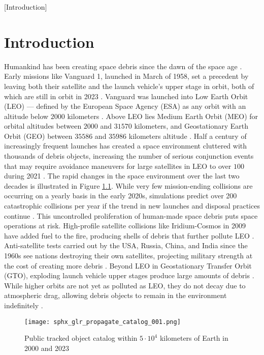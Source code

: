 [Introduction]
\graphicspath{{/Users/liamrobinson/Documents/PyLightCurves/docs/build/html/_images}}

\chapter{Introduction}

Humankind has been creating space debris since the dawn of the space age \cite{esareport2022}. Early missions like Vanguard 1, launched in March of 1958, set a precedent by leaving both their satellite and the launch vehicle's upper stage in orbit, both of which are still in orbit in 2023 \cite{vanguard1}. Vanguard was launched into Low Earth Orbit (LEO) --- defined by the European Space Agency (ESA) as any orbit with an altitude below $2000$ kilometers \cite{esareport2022}. Above LEO lies Medium Earth Orbit (MEO) for orbital altitudes between $2000$ and $31570$ kilometers, and Geostationary Earth Orbit (GEO) between $35586$ and $35986$ kilometers altitude \cite{esareport2022}. Half a century of increasingly frequent launches has created a space environment cluttered with thousands of debris objects, increasing the number of serious conjunction events that may require avoidance maneuvers for large satellites in LEO to over $100$ during 2021 \cite{esareport2022}. The rapid changes in the space environment over the last two decades is illustrated in Figure \ref{fig:catalog_comparison}. While very few mission-ending collisions are occurring on a yearly basis in the early 2020s, simulations predict over 200 catastrophic collisions per year if the trend in new launches and disposal practices continue \cite{esareport2022}. This uncontrolled proliferation of human-made space debris puts space operations at risk. High-profile satellite collisions like Iridium-Cosmos in 2009 have added fuel to the fire, producing shells of debris that further pollute LEO \cite{vallado4ed}. Anti-satellite tests carried out by the USA, Russia, China, and India since the 1960s see nations destroying their own satellites, projecting military strength at the cost of creating more debris \cite{vallado4ed}. Beyond LEO in Geostationary Transfer Orbit (GTO), exploding launch vehicle upper stages produce large amounts of debris \cite{esareport2022}. While higher orbits are not yet as polluted as LEO, they do not decay due to atmospheric drag, allowing debris objects to remain in the environment indefinitely \cite{vallado4ed}.

\begin{figure}[ht]
    \centering
    \texttt{[image: sphx\_glr\_propagate\_catalog\_001.png]}
    \caption{Public tracked object catalog within $5 \cdot 10^4$ kilometers of Earth in 2000 and 2023}
    \label{fig:catalog_comparison}
\end{figure}

